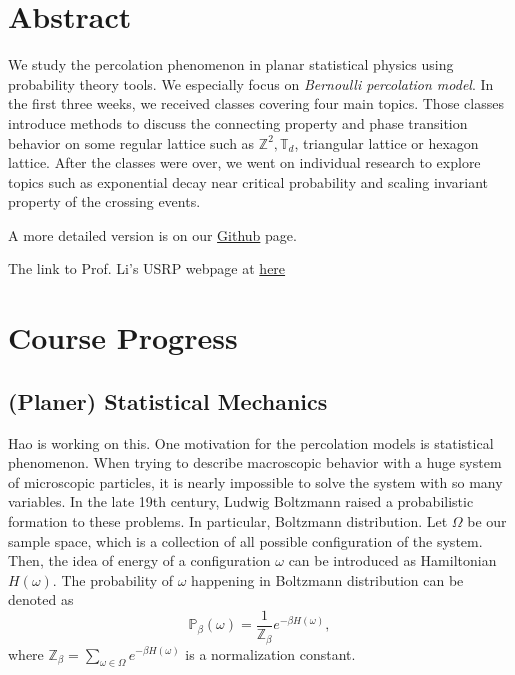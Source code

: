 \documentclass[12pt]{article}
\author{Chia-Cheng, Hao \quad Le-Rong, Hsu \quad Wei-Chieh, Hung \quad TBD \quad TBD \quad TBD}
\theoremstyle{plane}
\theoremstyle{definition}
\begin{document}
\clearpage\maketitle
\thispagestyle{empty}

\newpage
\setcounter{page}{1}
\section{Abstract}
We study the percolation phenomenon in planar statistical physics using probability theory tools. We especially focus on \textit{Bernoulli percolation model}. 
In the first three weeks, we received classes covering four main topics. Those classes introduce methods to discuss the connecting property and phase transition behavior on some regular lattice such as $\mathbb{Z}^2,\mathbb{T}_d$, triangular lattice or hexagon lattice. 
After the classes were over, we went on individual research to explore topics such as exponential decay near critical probability and scaling invariant property of the crossing events.

A more detailed version is on our \href{https://github.com/ausernamess/2022USRP-Group-7/blob/main/main.pdf}{Github} page. 

The link to Prof. Li's USRP webpage at \href{https://usrp2022.cadlag.space/}{here}
\section{Course Progress}

\setcounter{subsection}{-1}
\subsection{(Planer) Statistical Mechanics}
Hao is working on this.
One motivation for the percolation models is statistical phenomenon. When trying to describe macroscopic behavior with a huge system of microscopic particles, it is nearly impossible to solve the system with so many variables.
In the late 19th century, Ludwig Boltzmann raised a probabilistic formation to these problems. In particular, Boltzmann distribution. 
Let $\Omega$ be our sample space, which is a collection of all possible configuration of the system. Then, the idea of energy of a configuration $\omega$ can be introduced  as Hamiltonian $H(\omega)$.
The probability of $\omega$ happening in Boltzmann distribution can be denoted as 
$$
    \mathbb{P}_\beta(\omega) = \frac{1}{\mathbb{Z_\beta}}e^{-\beta H(\omega)}, 
$$ 
where $\mathbb{Z}_\beta = \sum_{\omega \in \Omega} e^{-\beta H(\omega)}$ is a normalization constant.
\end{document}
